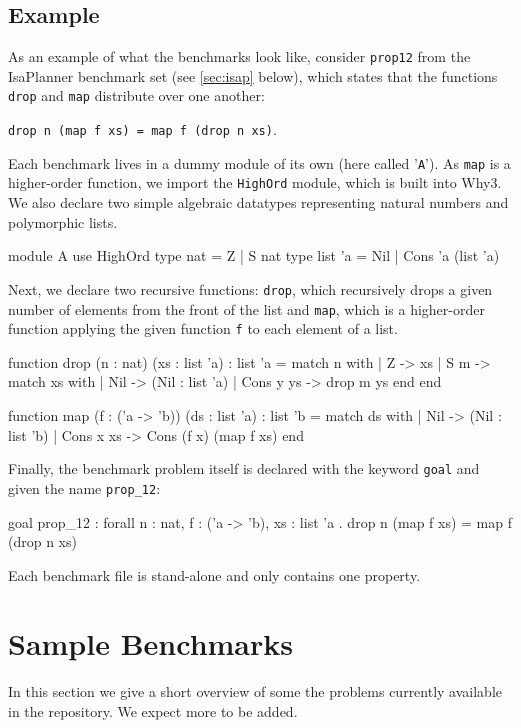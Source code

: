 \documentclass{llncs}
\begin{document}
\subsection*{Example}
As an example of what the benchmarks look like, consider \texttt{prop12} from the IsaPlanner benchmark set (see \ref{sec:isap} below), which states that the functions \texttt{drop} and \texttt{map} distribute over one another: \begin{center} \texttt{drop n (map f xs) = map f (drop n xs)}.\end{center}
Each benchmark lives in a dummy module of its own (here called '\texttt{A}'). As \texttt{map} is a higher-order function, we import the \texttt{HighOrd} module, which is built into Why3. We also declare two simple algebraic datatypes representing natural numbers and polymorphic lists.

\begin{code}
module A
  use HighOrd
  type nat = Z | S nat
  type list 'a = Nil | Cons 'a (list 'a)
\end{code}

Next, we declare two recursive functions: \texttt{drop}, which recursively drops a given number of elements from the front of the list and \texttt{map}, which is a higher-order function applying the given function \texttt{f} to each element of a list.

\begin{code}
function drop (n : nat) (xs : list 'a) : list 'a =
match n with
	| Z -> xs
	| S m ->
		match xs with
		| Nil -> (Nil : list 'a)
		| Cons y ys -> drop m ys
	end
end

function map (f : ('a -> 'b)) (ds : list 'a) : list 'b =
match ds with
	| Nil -> (Nil : list 'b)
	| Cons x xs -> Cons (f x) (map f xs)
end
\end{code}

Finally, the benchmark problem itself is declared with the keyword \texttt{goal} and given the name \texttt{prop\_12}:

\begin{code}
goal prop_12 :
  forall n : nat, f : ('a -> 'b), xs : list 'a .
  drop n (map f xs) = map f (drop n xs)
\end{code}
Each benchmark file is stand-alone and only contains one property. 

\section{Sample Benchmarks}
In this section we give a short overview of  some the problems currently available in the repository. We expect more to be added.
\end{document}
